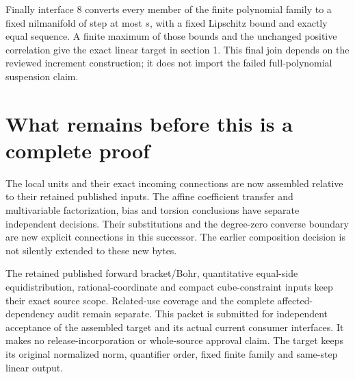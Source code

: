 \documentclass[11pt]{article}
\begin{document}
Finally interface 8 converts every member of the finite polynomial family
to a fixed nilmanifold of step at most $s$, with a fixed Lipschitz bound
and exactly equal sequence. A finite maximum of those bounds and the
unchanged positive correlation give the exact linear target in section 1.
This final join depends on the reviewed increment construction; it does
not import the failed full-polynomial suspension claim.

\section{What remains before this is a complete proof}

The local units and their exact incoming connections are now assembled
relative to their retained published inputs. The affine coefficient transfer
and multivariable factorization, bias and torsion conclusions have separate
independent decisions. Their substitutions and the degree-zero converse
boundary are new explicit connections in this successor. The earlier
composition decision is not silently extended to these new bytes.

The retained published forward bracket/Bohr, quantitative equal-side
equidistribution, rational-coordinate and compact cube-constraint inputs
keep their exact source scope. Related-use coverage and the complete
affected-dependency audit remain separate. This packet is submitted for
independent acceptance of the assembled target and its actual current
consumer interfaces. It makes no release-incorporation or whole-source
approval claim. The target keeps its original normalized norm, quantifier
order, fixed finite family and same-step linear output.
\end{document}
